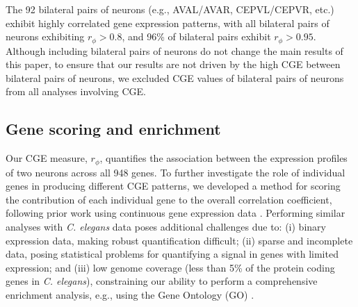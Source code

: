 \documentclass[10pt,letterpaper]{article}
\begin{document}
The 92 bilateral pairs of neurons (e.g., AVAL/AVAR, CEPVL/CEPVR, etc.) exhibit highly correlated gene expression patterns, with all bilateral pairs of neurons exhibiting $r_\phi > 0.8$, and 96\% of bilateral pairs exhibit $r_\phi > 0.95$.
Although including bilateral pairs of neurons do not change the main results of this paper, to ensure that our results are not driven by the high CGE between bilateral pairs of neurons, we excluded CGE values of bilateral pairs of neurons from all analyses involving CGE.


\subsection*{Gene scoring and enrichment}
Our CGE measure, $r_\phi$, quantifies the association between the expression profiles of two neurons across all 948 genes.
To further investigate the role of individual genes in producing different CGE patterns, we developed a method for scoring the contribution of each individual gene to the overall correlation coefficient, following prior work using continuous gene expression data \cite{Fulcher:2016ck}.
Performing similar analyses with \emph{C. elegans} data poses additional challenges due to:
(i) binary expression data, making robust quantification difficult;
(ii) sparse and incomplete data, posing statistical problems for quantifying a signal in genes with limited expression;
and (iii) low genome coverage (less than 5\% of the protein coding genes in \emph{C. elegans}), constraining our ability to perform a comprehensive enrichment analysis, e.g., using the Gene Ontology (GO) \cite{Ashburner2000}.
\end{document}
